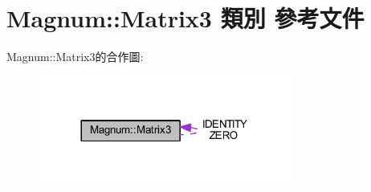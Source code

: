 \hypertarget{class_magnum_1_1_matrix3}{}\section{Magnum\+:\+:Matrix3 類別 參考文件}
\label{class_magnum_1_1_matrix3}


Magnum\+:\+:Matrix3的合作圖\+:\nopagebreak
\begin{figure}[H]
\begin{center}
\leavevmode
\includegraphics[width=236pt]{class_magnum_1_1_matrix3__coll__graph}
\end{center}
\end{figure}
